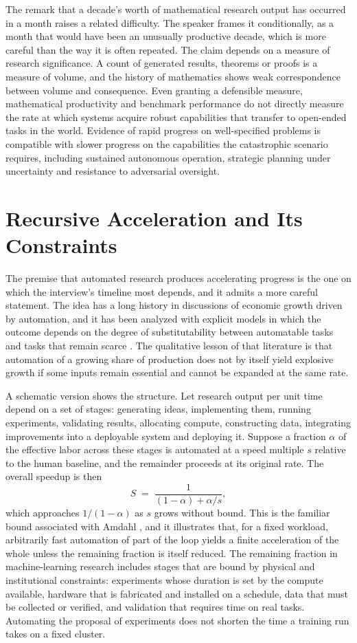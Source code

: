 \documentclass[11pt]{article}
\begin{document}
The remark that a decade's worth of mathematical research output has occurred in a month raises a related difficulty. The speaker frames it conditionally, as a month that would have been an unusually productive decade, which is more careful than the way it is often repeated. The claim depends on a measure of research significance. A count of generated results, theorems or proofs is a measure of volume, and the history of mathematics shows weak correspondence between volume and consequence. Even granting a defensible measure, mathematical productivity and benchmark performance do not directly measure the rate at which systems acquire robust capabilities that transfer to open-ended tasks in the world. Evidence of rapid progress on well-specified problems is compatible with slower progress on the capabilities the catastrophic scenario requires, including sustained autonomous operation, strategic planning under uncertainty and resistance to adversarial oversight.

\section{Recursive Acceleration and Its Constraints}

The premise that automated research produces accelerating progress is the one on which the interview's timeline most depends, and it admits a more careful statement. The idea has a long history in discussions of economic growth driven by automation, and it has been analyzed with explicit models in which the outcome depends on the degree of substitutability between automatable tasks and tasks that remain scarce \cite{aghion2019,davidson2021}. The qualitative lesson of that literature is that automation of a growing share of production does not by itself yield explosive growth if some inputs remain essential and cannot be expanded at the same rate.

A schematic version shows the structure. Let research output per unit time depend on a set of stages: generating ideas, implementing them, running experiments, validating results, allocating compute, constructing data, integrating improvements into a deployable system and deploying it. Suppose a fraction $\alpha$ of the effective labor across these stages is automated at a speed multiple $s$ relative to the human baseline, and the remainder proceeds at its original rate. The overall speedup is then
\[
S \;=\; \frac{1}{(1-\alpha) + \alpha/s},
\]
which approaches $1/(1-\alpha)$ as $s$ grows without bound. This is the familiar bound associated with Amdahl \cite{amdahl1967}, and it illustrates that, for a fixed workload, arbitrarily fast automation of part of the loop yields a finite acceleration of the whole unless the remaining fraction is itself reduced. The remaining fraction in machine-learning research includes stages that are bound by physical and institutional constraints: experiments whose duration is set by the compute available, hardware that is fabricated and installed on a schedule, data that must be collected or verified, and validation that requires time on real tasks. Automating the proposal of experiments does not shorten the time a training run takes on a fixed cluster.
\end{document}

